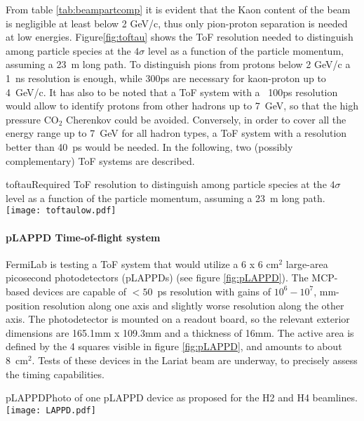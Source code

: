   From table \ref{tab:beampartcomp} it is evident that the Kaon content of the beam is negligible at least below 2 GeV/c, thus  only pion-proton separation is needed at low energies. Figure\ref{fig:toftau} shows the ToF resolution needed to distinguish among particle species at the $4\sigma$ level as a function of the particle momentum, assuming a 23~m long path. To distinguish pions from protons below 2 GeV/c a 1~ns resolution is enough, while 300ps are necessary for kaon-proton up to  4~GeV/c. It has also to be noted that a ToF system with a ~100ps resolution would allow to identify protons from other hadrons up to 7~GeV, so that the high pressure CO$_2$ Cherenkov could be avoided. Conversely, in order to cover all the energy range up to 7~GeV for all hadron  types, a ToF system with a resolution better than 40~ps would be needed.
In the following, two (possibly complementary) ToF systems are described.
\begin{cdrfigure}{toftau}{Required ToF resolution to  distinguish among particle species at the $4\sigma$ level as a function of the particle momentum, assuming a 23~m long path. }
\texttt{[image: toftaulow.pdf]}
\end{cdrfigure}

\paragraph{pLAPPD Time-of-flight system}
FermiLab is testing a ToF system that would utilize a 6 x 6 cm$^2$
large-area picosecond photodetectors (pLAPPDs) (see figure \ref{fig:pLAPPD}).
 The MCP-based devices
are capable of $< 50$~ps resolution with gains of $10^6-10^7$,
mm-position resolution along one axis and slightly worse resolution
along the other axis.  The photodetector is mounted on a readout
board, so the relevant exterior dimensions are 165.1mm x 109.3mm and a
thickness of 16mm. The active area is defined by the 4 squares visible in figure \ref{fig:pLAPPD}, and amounts to about 8~cm$^2$. Tests of these devices in the Lariat beam are underway, to precisely assess the timing capabilities.
\begin{cdrfigure}[pLAPPD]{pLAPPD}{Photo of one pLAPPD device as proposed for the H2 and H4 beamlines.}
\texttt{[image: LAPPD.pdf]}
\end{cdrfigure}

